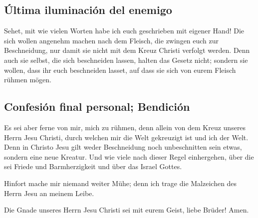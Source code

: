\hypertarget{uxfaltima-iluminaciuxf3n-del-enemigo}{%
\subsection{Última iluminación del
enemigo}\label{uxfaltima-iluminaciuxf3n-del-enemigo}}

 Sehet, mit wie vielen Worten habe ich euch geschrieben
mit eigener Hand!  Die sich wollen angenehm machen nach
dem Fleisch, die zwingen euch zur Beschneidung, nur damit sie nicht mit
dem Kreuz Christi verfolgt werden.  Denn auch sie selbst,
die sich beschneiden lassen, halten das Gesetz nicht; sondern sie
wollen, dass ihr euch beschneiden lasset, auf dass sie sich von eurem
Fleisch rühmen mögen.

\hypertarget{confesiuxf3n-final-personal-bendiciuxf3n}{%
\subsection{Confesión final personal;
Bendición}\label{confesiuxf3n-final-personal-bendiciuxf3n}}

 Es sei aber ferne von mir, mich zu rühmen, denn allein
von dem Kreuz unseres Herrn Jesu Christi, durch welchen mir die Welt
gekreuzigt ist und ich der Welt.  Denn in Christo Jesu
gilt weder Beschneidung noch unbeschnitten sein etwas, sondern eine neue
Kreatur.  Und wie viele nach dieser Regel einhergehen,
über die sei Friede und Barmherzigkeit und über das Israel Gottes.

 Hinfort mache mir niemand weiter Mühe; denn ich trage
die Malzeichen des Herrn Jesu an meinem Leibe.

 Die Gnade unseres Herrn Jesu Christi sei mit eurem
Geist, liebe Brüder! Amen.
